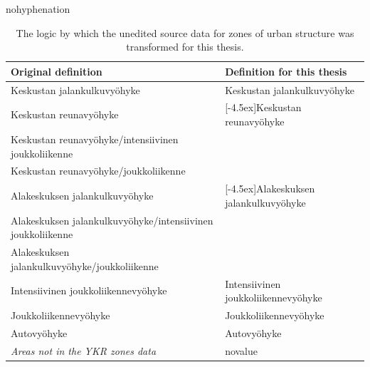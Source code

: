 \begin{hyphenrules}{nohyphenation}
    \begin{table}[H]
        \centering
        \def\arraystretch{1.2}
        \setlength\tabcolsep{1.2ex}
        \caption[YKR zones processing]{The logic by which the unedited source data for zones of urban structure was transformed for this thesis.}
        \label{tab:ykr_zones_simplify}
        \scalebox{0.9}
        {\begin{tabular}{ @{} >{\raggedright\arraybackslash}p{6cm} >{\raggedright\arraybackslash}p{6cm} @{} }
            \toprule
            Original definition & Definition for this thesis \\
            \midrule
            Keskustan jalankulkuvyöhyke & Keskustan jalankulkuvyöhyke \\
            \greyrule
            Keskustan reunavyöhyke & \multirow{3}{*}[-4.5ex]{Keskustan reunavyöhyke} \\
            Keskustan reunavyöhyke/intensiivinen joukkoliikenne & \\
            Keskustan reunavyöhyke/joukkoliikenne & \\
            \greyrule
            Alakeskuksen jalankulkuvyöhyke & \multirow{3}{*}[-4.5ex]{Alakeskuksen jalankulkuvyöhyke} \\
            Alakeskuksen jalankulkuvyöhyke/intensiivinen joukkoliikenne & \\
            Alakeskuksen jalankulkuvyöhyke/joukkoliikenne & \\
            \greyrule
            Intensiivinen joukkoliikennevyöhyke & Intensiivinen joukkoliikennevyöhyke \\ 
            \greyrule
            Joukkoliikennevyöhyke & Joukkoliikennevyöhyke \\
            \greyrule
            Autovyöhyke & Autovyöhyke \\
            \greyrule
            \textit{Areas not in the YKR zones data} & novalue \\
            \bottomrule
        \end{tabular}}
    \end{table} 
\end{hyphenrules}

